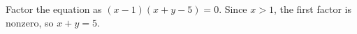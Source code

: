 Factor the equation as $(x-1)(x+y-5)=0$. Since $x>1$, the first factor is nonzero, so $\boxed{x+y=5}$.
